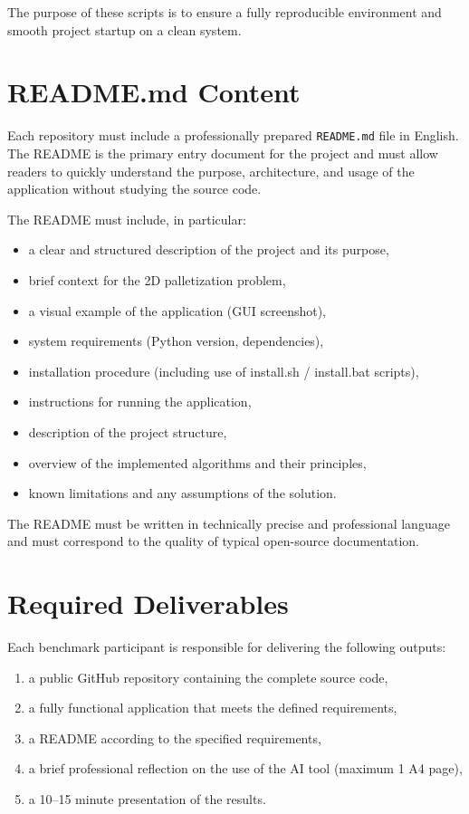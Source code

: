 \documentclass[12pt,a4paper]{article}
\begin{document}
The purpose of these scripts is to ensure a fully reproducible environment and smooth project startup on a clean system.

\section{README.md Content}

Each repository must include a professionally prepared
\texttt{README.md} file in English. The README is the primary
entry document for the project and must allow readers to quickly understand the purpose,
architecture, and usage of the application without studying the source code.

The README must include, in particular:

\begin{itemize}
    \item a clear and structured description of the project and its purpose,
    \item brief context for the 2D palletization problem,
    \item a visual example of the application (GUI screenshot),
    \item system requirements (Python version, dependencies),
    \item installation procedure (including use of install.sh / install.bat scripts),
    \item instructions for running the application,
    \item description of the project structure,
    \item overview of the implemented algorithms and their principles,
    \item known limitations and any assumptions of the solution.
\end{itemize}

The README must be written in technically precise and professional language
and must correspond to the quality of typical open-source documentation.

\section{Required Deliverables}

Each benchmark participant is responsible for delivering the following outputs:

\begin{enumerate}
    \item a public GitHub repository containing the complete source code,
    \item a fully functional application that meets the defined requirements,
    \item a README according to the specified requirements,
    \item a brief professional reflection on the use of the AI tool (maximum 1 A4 page),
    \item a 10--15 minute presentation of the results.
\end{enumerate}
\end{document}
